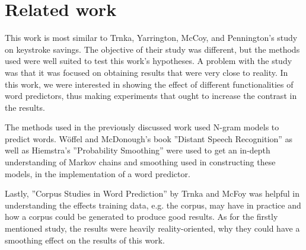 \section{Related work}

This work is most similar to Trnka, Yarrington, McCoy, and Pennington's study \cite{keystrokes} on keystroke savings. The objective of their study was different, but the methods used were well suited to test this work's hypotheses. A problem with the study was that it was focused on obtaining results that were very close to reality. In this work, we were interested in showing the effect of different functionalities of word predictors, thus making experiments that ought to increase the contrast in the results.

The methods used in the previously discussed work used N-gram models to predict words. Wöffel and McDonough's book ''Distant Speech Recognition'' \cite{search} as well as Hiemstra's ''Probability Smoothing'' \cite{smoothing} were used to get an in-depth understanding of Markov chains and smoothing used in constructing these models, in the implementation of a word predictor.

Lastly, ''Corpus Studies in Word Prediction'' by Trnka and McFoy \cite{corpus} was helpful in understanding the effects training data, e.g. the corpus, may have in practice and how a corpus could be generated to produce good results. As for the firstly mentioned study, the results were heavily reality-oriented, why they could have a smoothing effect on the results of this work.